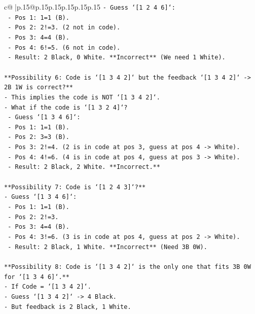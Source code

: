 \documentclass{article}
\begin{document}
{\begin{supertabular}{c@{$\;$}|p{.15\linewidth}@{}p{.15\linewidth}p{.15\linewidth}p{.15\linewidth}p{.15\linewidth}p{.15\linewidth}}
{{{\texttt{{-} Guess `{[}1 2 4 6{]}`:} \\
\texttt{    {-} Pos 1: 1=1 (B).} \\
\texttt{    {-} Pos 2: 2!=3. (2 not in code).} \\
\texttt{    {-} Pos 3: 4=4 (B).} \\
\texttt{    {-} Pos 4: 6!=5. (6 not in code).} \\
\texttt{    {-} Result: 2 Black, 0 White. **Incorrect** (We need 1 White).} \\
\\ 
\texttt{**Possibility 6: Code is `{[}1 3 4 2{]}` but the feedback `{[}1 3 4 2{]}` {-}> 2B 1W is correct?**} \\
\texttt{{-} This implies the code is NOT `{[}1 3 4 2{]}`.} \\
\texttt{{-} What if the code is `{[}1 3 2 4{]}`?} \\
\texttt{    {-} Guess `{[}1 3 4 6{]}`:} \\
\texttt{        {-} Pos 1: 1=1 (B).} \\
\texttt{        {-} Pos 2: 3=3 (B).} \\
\texttt{        {-} Pos 3: 2!=4. (2 is in code at pos 3, guess at pos 4 {-}> White).} \\
\texttt{        {-} Pos 4: 4!=6. (4 is in code at pos 4, guess at pos 3 {-}> White).} \\
\texttt{        {-} Result: 2 Black, 2 White. **Incorrect.**} \\
\\ 
\texttt{**Possibility 7: Code is `{[}1 2 4 3{]}`?**} \\
\texttt{{-} Guess `{[}1 3 4 6{]}`:} \\
\texttt{    {-} Pos 1: 1=1 (B).} \\
\texttt{    {-} Pos 2: 2!=3.} \\
\texttt{    {-} Pos 3: 4=4 (B).} \\
\texttt{    {-} Pos 4: 3!=6. (3 is in code at pos 4, guess at pos 2 {-}> White).} \\
\texttt{    {-} Result: 2 Black, 1 White. **Incorrect** (Need 3B 0W).} \\
\\ 
\texttt{**Possibility 8: Code is `{[}1 3 4 2{]}` is the only one that fits 3B 0W for `{[}1 3 4 6{]}`.**} \\
\texttt{{-} If Code = `{[}1 3 4 2{]}`.} \\
\texttt{{-} Guess `{[}1 3 4 2{]}` {-}> 4 Black.} \\
\texttt{{-} But feedback is 2 Black, 1 White.} \\
}}}
\end{supertabular}}
\end{document}
